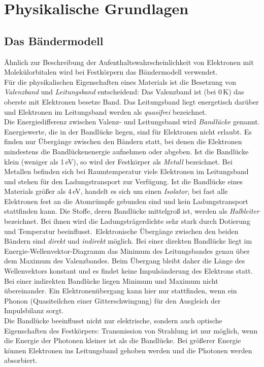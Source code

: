 \section{Physikalische Grundlagen}

\subsection{Das Bändermodell}

Ähnlich zur Beschreibung der Aufenthaltswahrscheinlichkeit von Elektronen mit Molekülorbitalen
wird bei Festkörpern das Bändermodell verwendet.\\
Für die physikalischen Eigenschaften eines Materials
ist die Besetzung von \emph{Valenzband} und \emph{Leitungsband} entscheidend:
Das Valenzband ist (bei 0\,K) das oberste mit Elektronen besetze Band.
Das Leitungsband liegt energetisch darüber und Elektronen im Leitungsband werden als \emph{quasifrei}
bezeichnet.\\
Die Energiedifferenz zwischen Valenz- und Leitungsband wird \emph{Bandlücke} genannt.
Energiewerte, die in der Bandlücke liegen, sind für Elektronen nicht erlaubt.
Es finden nur Übergänge zwischen den Bändern statt,
bei denen die Elektronen mindestens die Bandlückenenergie aufnehmen oder abgeben.
Ist die Bandlücke klein (weniger als 1\,eV), so wird der Festkörper als \emph{Metall} bezeichnet.
Bei Metallen befinden sich bei Raumtemperatur viele Elektronen im Leitungsband und stehen 
für den Ladungstransport zur Verfügung.
Ist die Bandlücke eines Materials größer als 4\,eV, handelt es sich um einen \emph{Isolator},
bei fast alle Elektronen
fest an die Atomrümpfe gebunden sind und kein Ladungstransport stattfinden kann.
Die Stoffe, deren Bandlücke mittelgroß ist, werden als \emph{Halbleiter} bezeichnet.
Bei ihnen wird die Ladungsträgerdichte sehr stark durch Dotierung und Temperatur beeinflusst.\
Elektronische Übergänge zwischen den beiden Bändern sind \emph{direkt} und \emph{indirekt} möglich.
Bei einer direkten Bandlücke liegt im Energie-Wellenvektor-Diagramm das Minimum des Leitungsbandes
genau über dem Maximum des Valenzbandes.
Beim Übergang bleibt daher die Länge des Wellenvektors konstant und
es findet keine Impulsänderung des Elektrons statt.
Bei einer indirekten Bandlücke liegen Minimum und Maximum nicht übereinander.
Ein Elektronenübergang kann hier nur stattfinden,
wenn ein Phonon (Quasiteilchen einer Gitterschwingung) für den Ausgleich der Impulsbilanz sorgt.\\[0.1cm]
Die Bandlücke beeinflusst nicht nur elektrische, sondern auch optische Eigenschaften des Festkörpers:
Transmission von Strahlung ist nur möglich,
wenn die Energie der Photonen kleiner ist als die Bandlücke.
Bei größerer Energie können Elektronen ins Leitungsband gehoben werden und die Photonen werden absorbiert.


